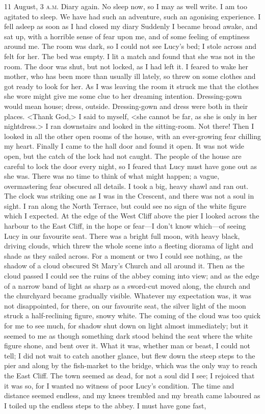 \begin{diary}{11 August, 3 \textsc{a.m.}}
Diary again. No sleep now, so I may as well write. I am too agitated to sleep. We have had such an adventure, such an agonising experience. I fell asleep as soon as I had closed my diary Suddenly I became broad awake, and sat up, with a horrible sense of fear upon me, and of some feeling of emptiness around me. The room was dark, so I could not see Lucy's bed; I stole across and felt for her. The bed was empty. I lit a match and found that she was not in the room. The door was shut, but not locked, as I had left it. I feared to wake her mother, who has been more than usually ill lately, so threw on some clothes and got ready to look for her. As I was leaving the room it struck me that the clothes she wore might give me some clue to her dreaming intention. Dressing-gown would mean house; dress, outside. Dressing-gown and dress were both in their places. <Thank God,> I said to myself, <she cannot be far, as she is only in her nightdress.> I ran downstairs and looked in the sitting-room. Not there! Then I looked in all the other open rooms of the house, with an ever-growing fear chilling my heart. Finally I came to the hall door and found it open. It was not wide open, but the catch of the lock had not caught. The people of the house are careful to lock the door every night, so I feared that Lucy must have gone out as she was. There was no time to think of what might happen; a vague, overmastering fear obscured all details. I took a big, heavy shawl and ran out. The clock was striking one as I was in the Crescent, and there was not a soul in sight. I ran along the North Terrace, but could see no sign of the white figure which I expected. At the edge of the West Cliff above the pier I looked across the harbour to the East Cliff, in the hope or fear—I don't know which—of seeing Lucy in our favourite seat. There was a bright full moon, with heavy black, driving clouds, which threw the whole scene into a fleeting diorama of light and shade as they sailed across. For a moment or two I could see nothing, as the shadow of a cloud obscured St Mary's Church and all around it. Then as the cloud passed I could see the ruins of the abbey coming into view; and as the edge of a narrow band of light as sharp as a sword-cut moved along, the church and the churchyard became gradually visible. Whatever my expectation was, it was not disappointed, for there, on our favourite seat, the silver light of the moon struck a half-reclining figure, snowy white. The coming of the cloud was too quick for me to see much, for shadow shut down on light almost immediately; but it seemed to me as though something dark stood behind the seat where the white figure shone, and bent over it. What it was, whether man or beast, I could not tell; I did not wait to catch another glance, but flew down the steep steps to the pier and along by the fish-market to the bridge, which was the only way to reach the East Cliff. The town seemed as dead, for not a soul did I see; I rejoiced that it was so, for I wanted no witness of poor Lucy's condition. The time and distance seemed endless, and my knees trembled and my breath came laboured as I toiled up the endless steps to the abbey. I must have gone fast, 
\end{diary}
